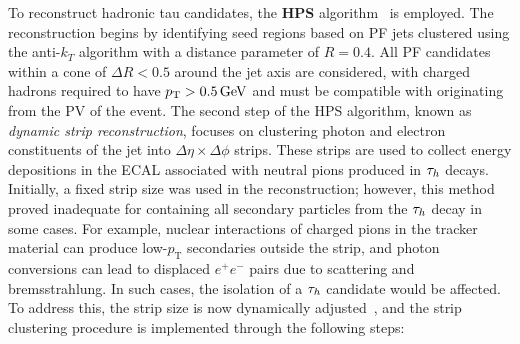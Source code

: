 To reconstruct hadronic tau candidates, the \textbf{\ac{HPS}} algorithm~\cite{Tau_Reco_ID_2015,Tau_Reco_ID_2018} is employed. The reconstruction begins by identifying seed regions based on \ac{PF} jets clustered using the anti-$k_T$ algorithm with a distance parameter of $R = 0.4$. All \ac{PF} candidates within a cone of $\Delta R < 0.5$ around the jet axis are considered, with charged hadrons required to have $p_\mathrm{T} > 0.5\,\text{Ge\hspace{-.08em}V}$ and must be compatible with originating from the \ac{PV} of the event. The second step of the \ac{HPS} algorithm, known as \textit{dynamic strip reconstruction}, focuses on clustering photon and electron constituents of the jet into $\Delta\eta \times \Delta\phi$ strips. These strips are used to collect energy depositions in the \ac{ECAL} associated with neutral pions produced in $\tau_h$ decays. Initially, a fixed strip size was used in the reconstruction; however, this method proved inadequate for containing all secondary particles from the $\tau_h$ decay in some cases. For example, nuclear interactions of charged pions in the tracker material can produce low-$p_\mathrm{T}$ secondaries outside the strip, and photon conversions can lead to displaced $e^+e^-$ pairs due to scattering and bremsstrahlung. In such cases, the isolation of a $\tau_h$ candidate would be affected. To address this, the strip size is now dynamically adjusted~\cite{Tau_Reco_ID_2018}, and the strip clustering procedure is implemented through the following steps:

